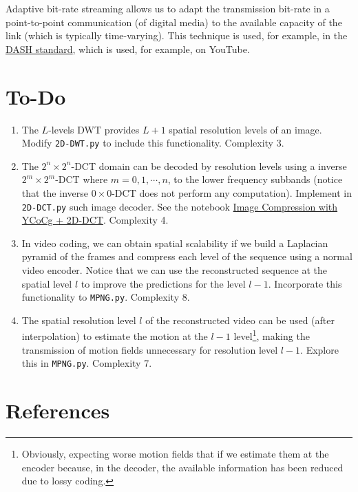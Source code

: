 Adaptive bit-rate streaming allows us to adapt the transmission bit-rate
in a point-to-point communication (of digital media) to the available
capacity of the link (which is typically time-varying). This
technique is used, for example, in the
\href{https://en.wikipedia.org/wiki/Dynamic_Adaptive_Streaming_over_HTTP}{DASH
  standard}, which is used, for example, on YouTube.


\section{To-Do}
\begin{enumerate}
\item The $L$-levels DWT provides $L+1$ spatial resolution levels of
  an image. Modify \texttt{2D-DWT.py} to include this
  functionality. Complexity 3.
\item The $2^n\times 2^n$-DCT domain can be decoded by resolution
  levels using a inverse $2^m\times 2^m$-DCT where $m=0,1,\cdots,n$,
  to the lower frequency subbands (notice that the inverse
  $0\times 0$-DCT does not perform any computation). Implement in
  \texttt{2D-DCT.py} such image decoder. See the notebook
  \href{https://github.com/vicente-gonzalez-ruiz/DCT2D/blob/master/docs/YCoCg_2D_DCT_SQ.ipynb}{Image
    Compression with YCoCg + 2D-DCT}. Complexity 4.
\item In video coding, we can obtain spatial scalability if we build a
  Laplacian pyramid of the frames and compress each level of the
  sequence using a normal video encoder. Notice that we can use the
  reconstructed sequence at the spatial level $l$ to improve the
  predictions for the level $l-1$. Incorporate this functionality to
  \texttt{MPNG.py}. Complexity 8.
\item The spatial resolution level $l$ of the reconstructed video can
  be used (after interpolation) to estimate the motion at the $l-1$
  level\footnote{Obviously, expecting worse motion fields that if we
    estimate them at the encoder because, in the decoder, the
    available information has been reduced due to lossy coding.},
  making the transmission of motion fields unnecessary for resolution
  level $l-1$. Explore this in \texttt{MPNG.py}. Complexity 7.
\end{enumerate}

\section{References}

\renewcommand{\addcontentsline}[3]{}%

